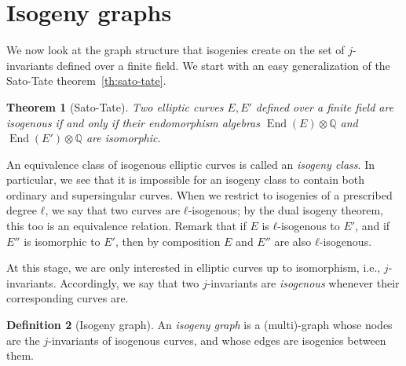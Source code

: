 \documentclass[10pt]{article}
\theoremstyle{plain}
\newtheorem{theorem}{Theorem}
\theoremstyle{definition}
\newtheorem{definition}[theorem]{Definition}
\DeclareMathOperator{\End}{End} %
\begin{document}
\section{Isogeny graphs}

We now look at the graph structure that isogenies create on the set of
$j$-invariants defined over a finite field. %
We start with an easy generalization of the Sato-Tate
theorem~\ref{th:sato-tate}.

\begin{theorem}[Sato-Tate]
  \label{th:sato-tate2}
  Two elliptic curves $E,E'$ defined over a finite field are isogenous
  if and only if their endomorphism algebras $\End(E)⊗ℚ$ and
  $\End(E')⊗ℚ$ are isomorphic.
\end{theorem}

An equivalence class of isogenous elliptic curves is called an
\emph{isogeny class}. %
In particular, we see that it is impossible for an isogeny class to
contain both ordinary and supersingular curves. %
When we restrict to isogenies of a prescribed degree $ℓ$, we say that
two curves are $ℓ$-isogenous; by the dual isogeny theorem, this too is
an equivalence relation. %
Remark that if $E$ is $ℓ$-isogenous to $E'$, and if $E''$ is
isomorphic to $E'$, then by composition $E$ and $E''$ are also
$ℓ$-isogenous. %

At this stage, we are only interested in elliptic curves up to
isomorphism, i.e., $j$-invariants. %
Accordingly, we say that two $j$-invariants are \emph{isogenous}
whenever their corresponding curves are. %

\begin{definition}[Isogeny graph]
  An \emph{isogeny graph} is a (multi)-graph whose nodes are the
  $j$-invariants of isogenous curves, and whose edges are isogenies
  between them.
\end{definition}
\end{document}
